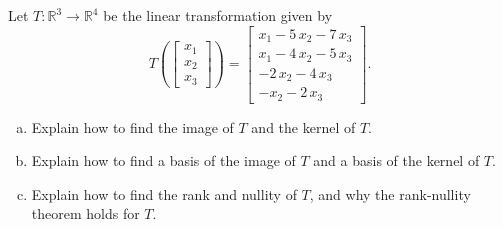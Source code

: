 
\begin{exerciseStatement}
 Let \(T:\mathbb{R}^ 3  \to \mathbb{R}^ 4 \) be the linear transformation given by \[T\left(  \left[\begin{array}{c}
x_{1} \\
x_{2} \\
x_{3}
\end{array}\right]  \right) =  \left[\begin{array}{c}
x_{1} - 5 \, x_{2} - 7 \, x_{3} \\
x_{1} - 4 \, x_{2} - 5 \, x_{3} \\
-2 \, x_{2} - 4 \, x_{3} \\
-x_{2} - 2 \, x_{3}
\end{array}\right] .\]
\begin{enumerate}[(a)]
\item Explain how to find the image of \(T\) and the kernel of \(T\).
\item Explain how to find a basis of the image of \(T\) and a basis of the kernel of \(T\).
\item Explain how to find the rank and nullity of \(T\), and why the rank-nullity theorem holds for \(T\).
\end{enumerate}
    
\end{exerciseStatement}
    
